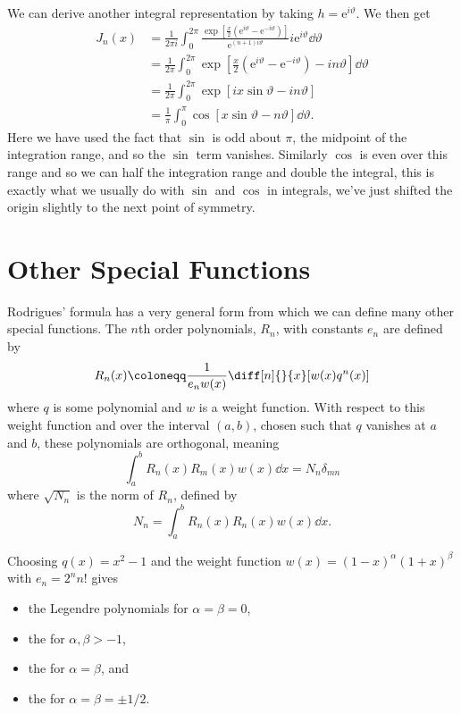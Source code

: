 \documentclass[fleqn]{NotesClass}
\newcommand*{\e}{\mathrm{e}}
\begin{document}
    We can derive another integral representation by taking \(h = \e^{i\vartheta}\).
    We then get
    \begin{align}
        J_n(x) &= \frac{1}{2\pi i} \int_{0}^{2\pi} \frac{\exp\left[ \frac{x}{2}(\e^{i\vartheta} - \e^{-i\vartheta}) \right]}{\e^{(n+1)i\vartheta}} i\e^{i\vartheta} \dd{\vartheta}\\
        &= \frac{1}{2\pi} \int_{0}^{2\pi} \exp\left[ \frac{x}{2}(\e^{i\vartheta} - \e^{-i\vartheta}) - in\vartheta \right] \dd{\vartheta}\\
        &= \frac{1}{2\pi} \int_{0}^{2\pi} \exp[ix\sin\vartheta - in\vartheta]\\
        &= \frac{1}{\pi} \int_{0}^{\pi} \cos[x\sin\vartheta - n\vartheta] \dd{\vartheta}.
    \end{align}
    Here we have used the fact that \(\sin\)  is odd about \(\pi\), the midpoint of the integration range, and so the \(\sin\) term vanishes.
    Similarly \(\cos\) is even over this range and so we can half the integration range and double the integral, this is exactly what we usually do with \(\sin\) and \(\cos\) in integrals, we've just shifted the origin slightly to the next point of symmetry.
    
    \section{Other Special Functions}
    Rodrigues' formula has a very general form from which we can define many other special functions.
    The \(n\)th order polynomials, \(R_n\), with constants \(e_n\) are defined by
    \begin{equation}
        R_n(x) \coloneqq \frac{1}{e_nw(x)} \diff[n]{}{x} [w(x) q^n(x)]
    \end{equation}
    where \(q\) is some polynomial and \(w\) is a weight function.
    With respect to this weight function and over the interval \((a, b)\), chosen such that \(q\) vanishes at \(a\) and \(b\), these polynomials are orthogonal, meaning
    \begin{equation}
        \int_a^b R_n(x) R_m(x) w(x) \dd{x} = N_n\delta_{mn}
    \end{equation}
    where \(\sqrt{N_n}\) is the norm of \(R_n\), defined by
    \begin{equation}
        N_n = \int_a^b R_n(x)R_n(x) w(x) \dd{x}.
    \end{equation}
    
    Choosing \(q(x) = x^2 - 1\) and the weight function \(w(x) = (1 - x)^\alpha(1 + x)^\beta\) with \(e_n = 2^nn!\) gives
    \begin{itemize}
        \item the Legendre polynomials for \(\alpha = \beta = 0\),
        \item the  for \(\alpha, \beta > -1\),
        \item the  for \(\alpha = \beta\), and
        \item the  for \(\alpha = \beta = \pm 1/2\).
    \end{itemize}
    
\end{document}
